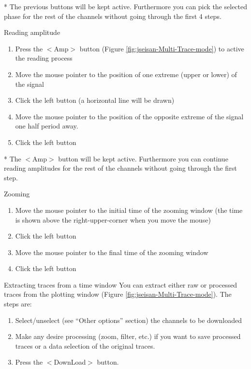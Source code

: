 * The previous buttons will be kept active. Furthermore you can pick the selected phase for the rest of the channels without going through the first 4 steps. 

Reading amplitude \newline
\begin{enumerate}
\item
 Press the $<$Amp$>$ button (Figure \ref{fig:jseisan-Multi-Trace-mode}) 
to active the reading process 
\item Move the mouse pointer to the position of one extreme (upper or lower) of the signal    
\item Click the left button (a horizontal line will be drawn) 
\item Move the mouse pointer to the position of the opposite extreme of the signal one half period away.  
\item Click the left button 
\end{enumerate}

* The $<$Amp$>$ button will be kept active. Furthermore you can continue reading amplitudes for the rest of the channels without going through the first step. 

Zooming \newline
\begin{enumerate}
\item
 Move the mouse pointer to the initial time of the zooming window (the time is shown above the right-upper-corner when you move the mouse) 
\item Click the left button 
\item Move the mouse pointer to the final time of the zooming window 
\item Click the left button 
\end{enumerate}


Extracting traces from a time window \newline
You can extract either raw or processed traces from the plotting window 
(Figure \ref{fig:jseisan-Multi-Trace-mode}). The steps are: 

\begin{enumerate}
\item
 Select/unselect (see ``Other options'' section) the channels to be downloaded  
\item Make any desire processing (zoom, filter, etc.) if you want to save  processed traces or a data selection of the original traces. 
\item Press the $<$DownLoad$>$ button.  
\end{enumerate}


